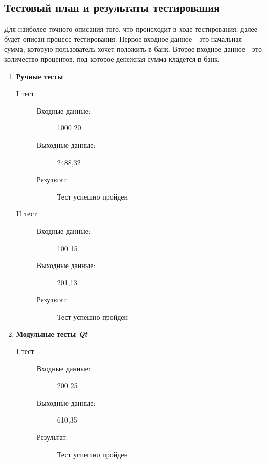 \documentclass[12pt,a4paper]{report}
\begin{document}
\subsection{Тестовый план и результаты тестирования}
\hspace{\parindent}
Для наиболее точного описания того, что происходит в ходе тестирования, далее будет описан процесс тестирования. Первое входное данное - это начальная сумма, которую пользователь хочет положить в банк. Второе входное данное - это количество процентов, под которое денежная сумма кладется в банк.
\begin{enumerate}
\item \textbf{Ручные тесты}
\begin{description}
\item[I тест]
\hspace{\parindent}
\begin{flushleft}
\begin{description}
\item[Входные данные:] 1000 20
\item[Выходные данные:] 2488,32
\item[Результат:] Тест успешно пройден
\end{description}
\end{flushleft}
\end{description}

\begin{description}
\item[II тест]
\hspace{\parindent}
\begin{flushleft}
\begin{description}
\item[Входные данные:] 100 15
\item[Выходные данные:] 201,13
\item[Результат:] Тест успешно пройден
\end{description}
\end{flushleft}
\end{description}

\item \textbf{Модульные тесты \textit{Qt}}
\begin{description}
\item[I тест]
\hspace{\parindent}
\begin{flushleft}
\begin{description}
\item[Входные данные:] 200 25
\item[Выходные данные:] 610,35
\item[Результат:] Тест успешно пройден
\end{description}
\end{flushleft}
\end{description}


\end{enumerate}
\end{document}
